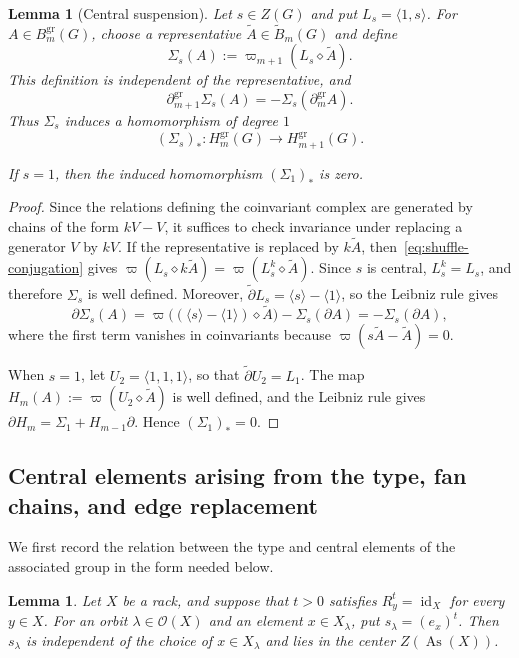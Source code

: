 \documentclass[11pt]{article}
\newtheorem{lemma}[theorem]{Lemma}
\DeclareMathOperator{\As}{As}
\newcommand{\OO}{\mathcal O}
\newcommand{\tB}{\widetilde B}
\newcommand{\td}{\widetilde\partial}
\newcommand{\gr}{\mathrm{gr}}
\begin{document}
\begin{lemma}[Central suspension]
\label{lem:center-suspension}
Let $s\in Z(G)$ and put $L_s=\langle1,s\rangle$. For
$A\in B_m^{\gr}(G)$, choose a representative
$\widetilde A\in\tB_m(G)$ and define
\[
 \Sigma_s(A)
 :=\varpi_{m+1}(L_s\diamond\widetilde A).
\]
This definition is independent of the representative, and
\[
 \partial_{m+1}^{\gr}\Sigma_s(A)
 =-\Sigma_s(\partial_m^{\gr}A).
\]
Thus $\Sigma_s$ induces a homomorphism of degree $1$
\[
 (\Sigma_s)_*\colon H_m^{\gr}(G)\longrightarrow H_{m+1}^{\gr}(G).
\]

If $s=1$, then the induced homomorphism $(\Sigma_1)_*$ is zero.
\end{lemma}

\begin{proof}
Since the relations defining the coinvariant complex are generated by chains of the form $kV-V$, it suffices to check invariance under replacing a generator $V$ by $kV$. If the representative is replaced by $k\widetilde A$, then~\eqref{eq:shuffle-conjugation} gives
$\varpi(L_s\diamond k\widetilde A)=\varpi(L_s^k\diamond\widetilde A)$. Since $s$ is central, $L_s^k=L_s$, and therefore $\Sigma_s$ is well defined. Moreover, $\td L_s=\langle s\rangle-\langle1\rangle$, so the Leibniz rule gives
\[
 \partial\Sigma_s(A)
 =\varpi\bigl((\langle s\rangle-\langle1\rangle)\diamond\widetilde A\bigr)
  -\Sigma_s(\partial A)
 =-\Sigma_s(\partial A),
\]
where the first term vanishes in coinvariants because $\varpi(s\widetilde A-\widetilde A)=0$.

When $s=1$, let $U_2=\langle1,1,1\rangle$, so that $\td U_2=L_1$. The map $H_m(A):=\varpi(U_2\diamond\widetilde A)$ is well defined, and the Leibniz rule gives
$\partial H_m=\Sigma_1+H_{m-1}\partial$. Hence $(\Sigma_1)_*=0$.
\end{proof}

\subsection{Central elements arising from the type, fan chains, and edge replacement}
\label{subsec:fan-edge-replacement}

We first record the relation between the type and central elements of the associated group in the form needed below.

\begin{lemma}
\label{lem:central-type}
Let $X$ be a rack, and suppose that $t>0$ satisfies $R_y^t=\operatorname{id}_X$ for every $y\in X$. For an orbit $\lambda\in\OO(X)$ and an element $x\in X_\lambda$, put $s_\lambda=(e_x)^t$. Then $s_\lambda$ is independent of the choice of $x\in X_\lambda$ and lies in the center $Z(\As(X))$.
\end{lemma}
\end{document}
